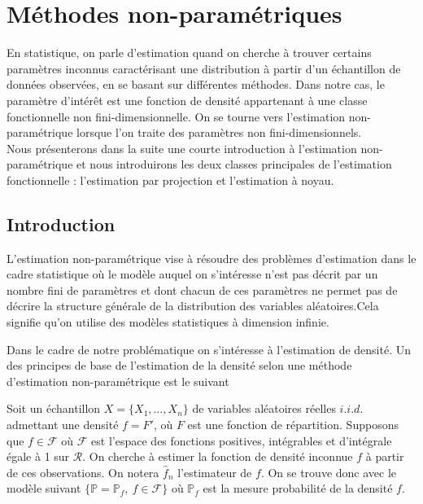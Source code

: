 \documentclass[
]{book}
\begin{document}
\hypertarget{muxe9thodes-non-paramuxe9triques}{%
\chapter{Méthodes non-paramétriques}\label{muxe9thodes-non-paramuxe9triques}}

\hspace*{0.5cm} En statistique, on parle d'estimation quand on cherche à trouver certains paramètres inconnus caractérisant une distribution à partir d'un échantillon de données observées, en se basant sur différentes méthodes.
Dans notre cas, le paramètre d'intérêt est une fonction de densité appartenant à une classe fonctionnelle non fini-dimensionnelle. On se tourne vers l'estimation non-paramétrique lorsque l'on traite des paramètres non fini-dimensionnels.\\
\hspace*{0.5cm} Nous présenterons dans la suite une courte introduction
à l'estimation non-paramétrique et nous introduirons les deux classes
principales de l'estimation fonctionnelle : l'estimation par projection
et l'estimation à noyau.

\hypertarget{introduction}{%
\section{Introduction}\label{introduction}}

\hspace*{0.5cm}

L'estimation non-paramétrique vise à résoudre des problèmes d'estimation dans le cadre statistique où le modèle auquel on s'intéresse n'est pas décrit par un nombre fini de paramètres et dont chacun de ces paramètres ne permet pas de décrire la structure générale de la distribution des variables aléatoires.\newline Cela signifie qu'on utilise des modèles statistiques à dimension infinie.

\hspace*{0.5cm}

Dans le cadre de notre problématique on s'intéresse à l'estimation de densité.\newline
Un des principes de base de l'estimation de la densité selon une méthode d'estimation non-paramétrique est le suivant \newline

Soit un échantillon \(X=\{X_1, \dots,X_n\}\) de variables aléatoires réelles \(i.i.d.\) admettant une densité \(f = F'\), où \(F\) est une fonction de répartition. Supposons que \(f \in \mathcal F\) où \(\mathcal{F}\) est l'espace des fonctions positives, intégrables et d'intégrale égale à 1 sur \({\mathcal R}\). On cherche à estimer la fonction de densité inconnue \(f\) à partir de ces observations.\newline
On notera \(\hat f_n\) l'estimateur de \(f\).\newline
On se trouve donc avec le modèle suivant \(\{\mathbb P=\mathbb P_f,~f \in \mathcal F\}\)
où \(\mathbb P_f\) est la mesure probabilité de la densité \(f\).
\end{document}
